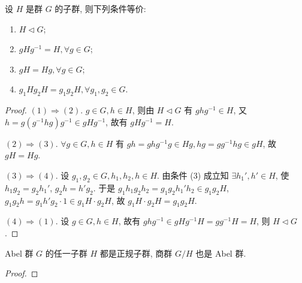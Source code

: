 \documentclass[../../main.tex]{subfiles}
\begin{document}
\begin{theorem}\label{theorem:抽象代数-定理 1.3.5}
设 \( H \) 是群 \( G \) 的子群, 则下列条件等价:
\begin{enumerate}[(1)]
\item \( H \lhd  G \);

\item \( gHg^{-1} = H, \forall g \in G \);

\item \( gH = Hg, \forall g \in G \);

\item \( g_1Hg_2H = g_1g_2H, \forall g_1, g_2 \in G \).
\end{enumerate}
\end{theorem}
\begin{proof}
\( (1) \Rightarrow (2) \). \( g \in G, h \in H \), 则由 \( H \lhd  G \) 有 \( ghg^{-1} \in H \), 又 \( h = g(g^{-1}hg)g^{-1} \in gHg^{-1} \), 故有 \( gHg^{-1} = H \).

\( (2) \Rightarrow (3) \). \( \forall g \in G, h \in H \) 有 \( gh = ghg^{-1}g \in Hg, hg = gg^{-1}hg \in gH \), 故 \( gH = Hg \).

\( (3) \Rightarrow (4) \). 设 \( g_1, g_2 \in G, h_1, h_2, h \in H \). 由条件 (3) 成立知 \( \exists h_1', h' \in H \), 使 \( h_1g_2 = g_2h_1' \), \( g_2h = h'g_2 \). 于是 \( g_1h_1g_2h_2 = g_1g_2h_1'h_2 \in g_1g_2H \), \( g_1g_2h = g_1h'g_2 \cdot 1 \in g_1H \cdot g_2H \), 故 \( g_1H \cdot g_2H = g_1g_2H \).

\( (4) \Rightarrow (1) \). 设 \( g \in G, h \in H \), 故有 \( ghg^{-1} \in gHg^{-1}H = gg^{-1}H = H \), 则 \( H \lhd  G \).

\end{proof}

\begin{proposition}
Abel 群 \( G \) 的任一子群 \( H \) 都是正规子群, 商群 \( G/H \) 也是 Abel 群.
\end{proposition}
\begin{proof}


\end{proof}
\end{document}
